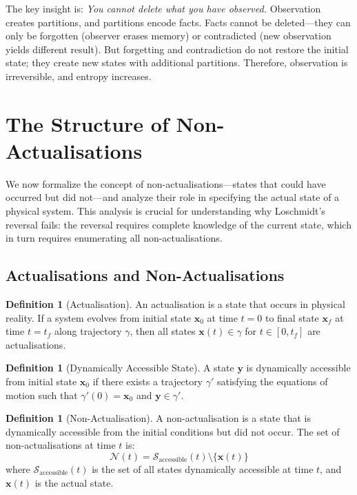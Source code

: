 \documentclass[twocolumn,10pt]{article}
\theoremstyle{definition}
\newtheorem{definition}[theorem]{Definition}
\theoremstyle{remark}
\begin{document}
\noindent The key insight is: \textit{You cannot delete what you have observed.} Observation creates partitions, and partitions encode facts. Facts cannot be deleted—they can only be forgotten (observer erases memory) or contradicted (new observation yields different result). But forgetting and contradiction do not restore the initial state; they create new states with additional partitions. Therefore, observation is irreversible, and entropy increases.


\section{The Structure of Non-Actualisations}
\label{sec:non_act_structure}

We now formalize the concept of non-actualisations—states that could have occurred but did not—and analyze their role in specifying the actual state of a physical system. This analysis is crucial for understanding why Loschmidt's reversal fails: the reversal requires complete knowledge of the current state, which in turn requires enumerating all non-actualisations.

\subsection{Actualisations and Non-Actualisations}

\begin{definition}[Actualisation]
An actualisation is a state that occurs in physical reality. If a system evolves from initial state $\mathbf{x}_0$ at time $t = 0$ to final state $\mathbf{x}_f$ at time $t = t_f$ along trajectory $\gamma$, then all states $\mathbf{x}(t) \in \gamma$ for $t \in [0, t_f]$ are actualisations.
\end{definition}

\begin{definition}[Dynamically Accessible State]
A state $\mathbf{y}$ is dynamically accessible from initial state $\mathbf{x}_0$ if there exists a trajectory $\gamma'$ satisfying the equations of motion such that $\gamma'(0) = \mathbf{x}_0$ and $\mathbf{y} \in \gamma'$.
\end{definition}

\begin{definition}[Non-Actualisation]
A non-actualisation is a state that is dynamically accessible from the initial conditions but did not occur. The set of non-actualisations at time $t$ is:
$$
\mathcal{N}(t) = \mathcal{S}_{\text{accessible}}(t) \setminus \{\mathbf{x}(t)\}
$$
where $\mathcal{S}_{\text{accessible}}(t)$ is the set of all states dynamically accessible at time $t$, and $\mathbf{x}(t)$ is the actual state.
\end{definition}
\end{document}
